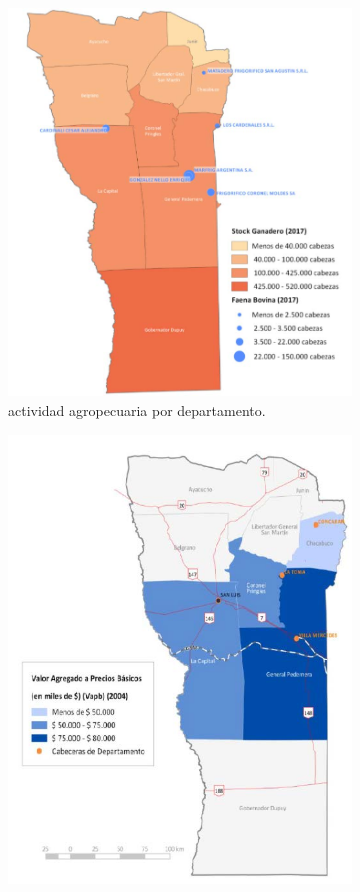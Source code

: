 \documentclass[11pt,a4paper]{article}
\begin{document}
\begin{figure}[ht!]
        \centering
        \begin{subfigure}[b]{0.48\textwidth}
        \centering
            \includegraphics[width=0.9\linewidth]{fotos_ema/agropecuaria}
            \captionsetup{width=0.7\linewidth}
            \caption{actividad agropecuaria por departamento.}
            \label{fig:agropecuaria}     
        \end{subfigure}%
        \begin{subfigure}[b]{0.48\textwidth}
        \centering
            \includegraphics[width=0.9\linewidth]{fotos_ema/industria}

\end{subfigure}
\end{figure}
\end{document}
